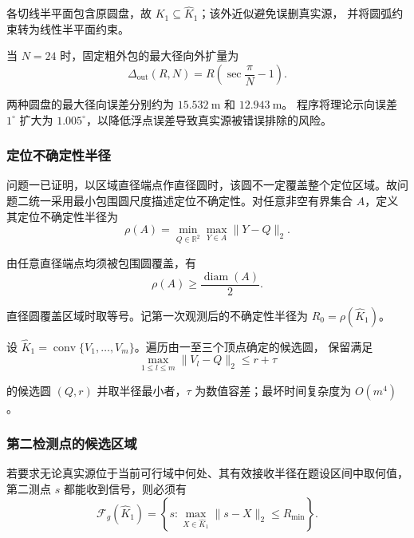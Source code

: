 各切线半平面包含原圆盘，故 $K_1\subseteq\widehat K_1$；该外近似避免误删真实源，
并将圆弧约束转为线性半平面约束。

当 $N=24$ 时，固定粗外包的最大径向外扩量为
\begin{equation}
  \Delta_{\mathrm{out}}(R,N)
  =R\left(\sec\frac{\pi}{N}-1\right).
\end{equation}

两种圆盘的最大径向误差分别约为 $15.532\ \mathrm{m}$ 和 $12.943\ \mathrm{m}$。
程序将理论示向误差 $1^\circ$ 扩大为 $1.005^\circ$，以降低浮点误差导致真实源被错误排除的风险。

\subsubsection{定位不确定性半径}

问题一已证明，以区域直径端点作直径圆时，该圆不一定覆盖整个定位区域。故问题二统一采用最小包围圆尺度描述定位不确定性。对任意非空有界集合 $A$，定义其定位不确定性半径为
\begin{equation}
  \rho(A)=\min_{Q\in\mathbb R^2}
  \max_{Y\in A}\|Y-Q\|_2.
  \label{eq:q2-mec-radius}
\end{equation}

由任意直径端点均须被包围圆覆盖，有
\begin{equation}
  \rho(A)\geq\frac{\operatorname{diam}(A)}{2}.
  \label{eq:q2-diameter-mec}
\end{equation}

直径圆覆盖区域时取等号。记第一次观测后的不确定性半径为 $R_0=\rho(\widehat K_1)$。

设 $\widehat K_1=\operatorname{conv}\{V_1,\ldots,V_m\}$。遍历由一至三个顶点确定的候选圆，
保留满足
\begin{equation}
  \max_{1\leq l\leq m}\|V_l-Q\|_2\leq r+\tau
  \label{eq:q2-mec-cover-test}
\end{equation}

的候选圆 $(Q,r)$ 并取半径最小者，$\tau$ 为数值容差；最坏时间复杂度为 $O(m^4)$。

\subsubsection{第二检测点的候选区域}

若要求无论真实源位于当前可行域中何处、其有效接收半径在题设区间中取何值，第二测点 $s$ 都能收到信号，则必须有
\begin{equation}
  \mathcal F_g(\widehat K_1)
  =\left\{s:\max_{X\in\widehat K_1}
  \|s-X\|_2\leq R_{\min}\right\}.
  \label{eq:q2-guaranteed-region}
\end{equation}

